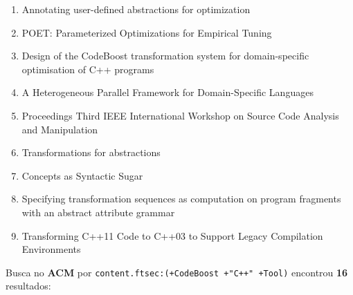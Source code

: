 \begin{enumerate}
\item Annotating user-defined abstractions for optimization
\item POET: Parameterized Optimizations for Empirical Tuning
\item Design of the CodeBoost transformation system for domain-specific optimisation of C++ programs
\item A Heterogeneous Parallel Framework for Domain-Specific Languages
\item Proceedings Third IEEE International Workshop on Source Code Analysis and Manipulation
\item Transformations for abstractions
\item Concepts as Syntactic Sugar
\item Specifying transformation sequences as computation on program fragments with an abstract attribute grammar
\item Transforming C++11 Code to C++03 to Support Legacy Compilation Environments
\end{enumerate}

Busca no {\bf ACM} por
\texttt{content.ftsec:(+CodeBoost +"C++" +Tool)}
encontrou {\bf 16}
resultados:

